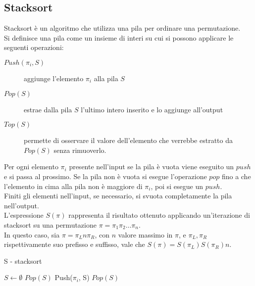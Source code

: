 \subsection{Stacksort}
Stacksort \`e un algoritmo che utilizza una pila per ordinare una permutazione.\\ 
Si definisce una pila come un insieme di interi su cui si possono applicare le seguenti operazioni:
\begin{description}
   \item[$Push(\pi_i, S)$] aggiunge l'elemento $\pi_i$ alla pila $S$
   \item[$Pop(S)$] estrae dalla pila $S$ l'ultimo intero inserito e lo aggiunge all'output
   \item[$Top(S)$] permette di osservare il valore dell'elemento che verrebbe estratto da $Pop(S)$ senza rimuoverlo.
\end{description}
Per ogni elemento $\pi_i$ presente nell'input se la pila \`e vuota viene eseguito un $push$ e si passa al prossimo. Se la pila non \`e vuota si esegue l'operazione $pop$ fino a che l'elemento in cima alla pila non \`e maggiore di $\pi_i$, poi si esegue un $push$.\\
Finiti gli elementi nell'input, se necessario, si svuota completamente la pila nell'output.\cite{limbrief}\\
L'espressione $S(\pi)$ rappresenta il risultato ottenuto applicando un'iterazione di stacksort su una permutazione $\pi = \pi_1\pi_2\dots\pi_n$.\\
In questo caso, sia $\pi = \pi_Ln\pi_R$, con $n$ valore massimo in $\pi$, e $\pi_L, \pi_R$ rispettivamente suo prefisso e suffisso, vale che $S(\pi)=S(\pi_L)S(\pi_R)n$.
\begin{algorithm}[H]
   \caption{S - stacksort}
\begin{algorithmic}[1]
\State $S\leftarrow\emptyset$
         \State $Pop(S)$
      \EndWhile
      \State Push($\pi_i$, S)
   \EndFor
      \State $Pop(S)$
   \EndWhile
\end{algorithmic}
\end{algorithm}
